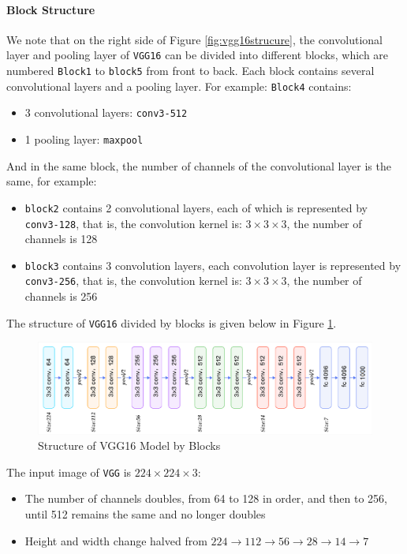 \paragraph{Block Structure}
We note that on the right side of Figure \ref{fig:vgg16strucure}, the convolutional layer and pooling layer of \verb|VGG16| can be divided into different blocks, which are numbered \verb|Block1| to \verb|block5| from front to back. Each block contains several convolutional layers and a pooling layer. For example: \verb|Block4| contains:
\begin{itemize}
    \item 3 convolutional layers: \verb|conv3-512|
    \item 1 pooling layer: \verb|maxpool|
\end{itemize}

And in the same block, the number of channels of the convolutional layer is the same, for example:
\begin{itemize}
    \item \verb|block2| contains 2 convolutional layers, each of which is represented by \verb|conv3-128|, that is, the convolution kernel is: $3\times3\times3$, the number of channels is 128
    \item \verb|block3| contains 3 convolution layers, each convolution layer is represented by \verb|conv3-256|, that is, the convolution kernel is: $3\times3\times3$, the number of channels is 256
\end{itemize}

The structure of \verb|VGG16| divided by blocks is given below in Figure \ref{fig:vgg16blockstrucure}.

\begin{figure}[h!]
\centering
\includegraphics[width=.9\textwidth]{vgg16blockstruc.pdf}
\caption{Structure of VGG16 Model by Blocks \cite{vgg16}}
\label{fig:vgg16blockstrucure}
\end{figure}

The input image of \verb|VGG| is $224\times224\times3$:
\begin{itemize}
    \item The number of channels doubles, from 64 to 128 in order, and then to 256, until 512 remains the same and no longer doubles
    \item Height and width change halved from $224 \to 112 \to 56 \to 28 \to 14 \to 7$
\end{itemize}

